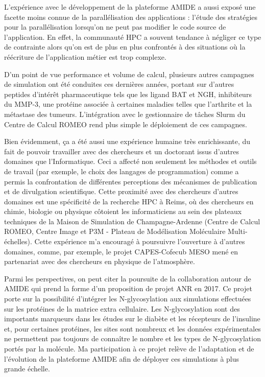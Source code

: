 L'expérience avec le développement de la plateforme AMIDE a aussi exposé une facette moins connue de la parallélisation des applications : l'étude des stratégies pour la parallélisation lorsqu'on ne peut pas modifier le code source de l'application. En effet, la communauté HPC a souvent tendance à négliger ce type de contrainte alors qu'on est de plus en plus confrontés à des situations où la réécriture de l'application métier est trop complexe.  

D'un point de vue performance et volume de calcul, plusieurs autres campagnes de simulation ont été conduites ces dernières années, portant sur d'autres peptides d'intérêt pharmaceutique tels que les ligand BAT et NGH, inhibiteurs du MMP-3, une protéine associée à certaines maladies telles que l'arthrite et la métastase des tumeurs. L'intégration avec le gestionnaire de tâches Slurm du Centre de Calcul ROMEO rend plus simple le déploiement de ces campagnes.

Bien évidemment, ça a été aussi une expérience humaine très enrichissante, du fait de pouvoir travailler avec des chercheurs et un doctorant issus d'autres domaines que l'Informatique. Ceci a affecté non seulement les méthodes et outils de travail (par exemple, le choix des langages de programmation) comme a permis la confrontation de différentes perceptions des mécanismes de publication et de divulgation scientifique. Cette proximité avec des chercheurs d'autres domaines est une spécificité de la recherche HPC à Reims, où des chercheurs en chimie, biologie ou physique côtoient les informaticiens au sein des plateaux techniques de la Maison de Simulation de Champagne-Ardenne (Centre de Calcul ROMEO, Centre Image et P3M - Plateau de Modélisation Moléculaire Multi-échelles). Cette expérience m'a encouragé à poursuivre l'ouverture à d'autres domaines, comme, par exemple, le projet CAPES-Cofecub MESO mené en partenariat avec des chercheurs en physique de l'atmosphère.

Parmi les perspectives, on peut citer la poursuite de la collaboration autour de AMIDE qui prend la forme d'un proposition de projet ANR en 2017. Ce projet porte sur la possibilité d'intégrer les N-glycosylation aux simulations effectuées sur les protéines de la matrice extra cellulaire. Les N-glycosylation sont des importants marqueurs dans les études sur le diabète et les récepteurs de l'insuline et, pour certaines protéines, les sites sont nombreux et les données expérimentales ne permettent pas toujours de connaître le nombre et les types de N-glycosylation portés par la molécule. Ma participation à ce projet relève de l'adaptation et de l'évolution de la plateforme AMIDE afin de déployer ces simulations à plus grande échelle.  


 








